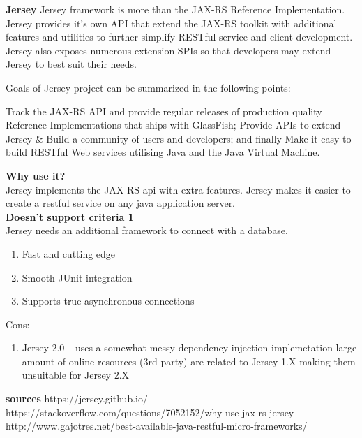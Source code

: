 \textbf{Jersey}
Jersey framework is more than the JAX-RS Reference Implementation. Jersey provides it’s own API that extend the JAX-RS toolkit with additional features and utilities to further simplify RESTful service and client development. Jersey also exposes numerous extension SPIs so that developers may extend Jersey to best suit their needs.

Goals of Jersey project can be summarized in the following points:

Track the JAX-RS API and provide regular releases of production quality Reference Implementations that ships with GlassFish;
Provide APIs to extend Jersey & Build a community of users and developers; and finally
Make it easy to build RESTful Web services utilising Java and the Java Virtual Machine.


\textbf{Why use it?} \\
Jersey implements the JAX-RS api with extra features. Jersey makes it easier to create a restful service on any java application server. \\

\textbf{Doesn't support criteria 1}\\
Jersey needs an additional framework  to connect with a database.

\begin{enumerate}
	\item Fast and cutting edge
	\item Smooth JUnit integration
	\item Supports true asynchronous connections
\end{enumerate}
Cons:
\begin{enumerate}
	\item Jersey 2.0+ uses a somewhat messy dependency injection implemetation
	\itemA large amount of online resources (3rd party) are related to Jersey 1.X making them unsuitable for Jersey 2.X
\end{enumerate}

\textbf{sources}
https://jersey.github.io/
https://stackoverflow.com/questions/7052152/why-use-jax-rs-jersey
http://www.gajotres.net/best-available-java-restful-micro-frameworks/